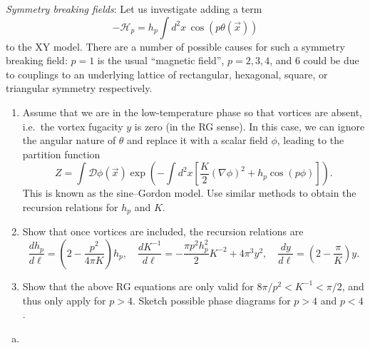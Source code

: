 \begin{problem}
    \textit{Symmetry breaking fields}: Let us investigate adding a term
    \[
        -\mathcal{H}_p = h_p\int d^2x\,\cos(p\theta(\vec{x}))
    \]
    to the XY model. There are a number of possible causes for such a symmetry breaking field: $p = 1$ is the usual ``magnetic field'', $p = 2, 3, 4$, and $6$ could be due to couplings to an underlying lattice of rectangular, hexagonal, square, or triangular symmetry respectively.

    \begin{enumerate}
        \item[(a)] Assume that we are in the low-temperature phase so that vortices are absent, i.e.\ the vortex fugacity $y$ is zero (in the RG sense). In this case, we can ignore the angular nature of $\theta$ and replace it with a scalar field $\phi$, leading to the partition function
        \[
            Z = \int \mathcal{D}\phi(\vec{x})\exp\!\left(-\int d^2x\left[\frac{K}{2}(\nabla\phi)^2 + h_p\cos(p\phi)\right]\right).
        \]
        This is known as the sine--Gordon model. Use similar methods to obtain the recursion relations for $h_p$ and $K$.

        \item[(b)] Show that once vortices are included, the recursion relations are
        \[
            \frac{dh_p}{d\ell} = \left(2 - \frac{p^2}{4\pi K}\right)h_p, \quad
            \frac{dK^{-1}}{d\ell} = -\frac{\pi p^2 h_p^2}{2}K^{-2} + 4\pi^3 y^2, \quad
            \frac{dy}{d\ell} = \left(2 - \frac{\pi}{K}\right)y.
        \]

        \item[(c)] Show that the above RG equations are only valid for $8\pi/p^2 < K^{-1} < \pi/2$, and thus only apply for $p > 4$. Sketch possible phase diagrams for $p > 4$ and $p < 4$.
    \end{enumerate}
\end{problem}

\begin{solution}
    \begin{enumerate}[(a)]
        \item
    \end{enumerate}
\end{solution}

